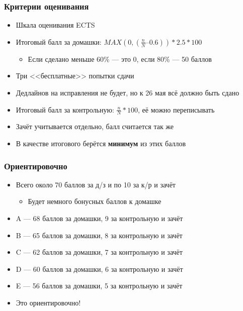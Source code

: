 \documentclass[xetex,mathserif,serif]{beamer}
\begin{document}
    \begin{frame}
        \frametitle{Критерии оценивания}
        \begin{itemize}
            \item Шкала оценивания ECTS
            \item Итоговый балл за домашки: $MAX(0, (\frac{n}{N} – 0.6)) * 2.5 * 100$
            \begin{itemize}
                \item Если сделано меньше 60\% --- это 0, если 80\% --- 50 баллов
            \end{itemize}
            \item Три <<бесплатные>> попытки сдачи
            \item Дедлайнов на исправления не будет, но к 26 мая всё должно быть сдано
            \item Итоговый балл за контрольную: $\frac{n}{N} * 100$, её можно переписывать
            \item Зачёт учитывается отдельно, балл считается так же
            \item В качестве итогового берётся \textbf{минимум} из этих баллов
        \end{itemize}
    \end{frame}

    \begin{frame}
        \frametitle{Ориентировочно}
        \begin{itemize}
            \item Всего около 70 баллов за д/з и по 10 за к/р и зачёт
            \begin{itemize}
                \item Будет немного бонусных баллов к домашке
            \end{itemize}
            \item A --- 68 баллов за домашки, 9 за контрольную и зачёт
            \item B --- 65 баллов за домашки, 8 за контрольную и зачёт
            \item C --- 62 баллов за домашки, 7 за контрольную и зачёт
            \item D --- 60 баллов за домашки, 6 за контрольную и зачёт
            \item E --- 56 баллов за домашки, 5 за контрольную и зачёт
            \item Это ориентировочно!
        \end{itemize}
    \end{frame}
\end{document}
